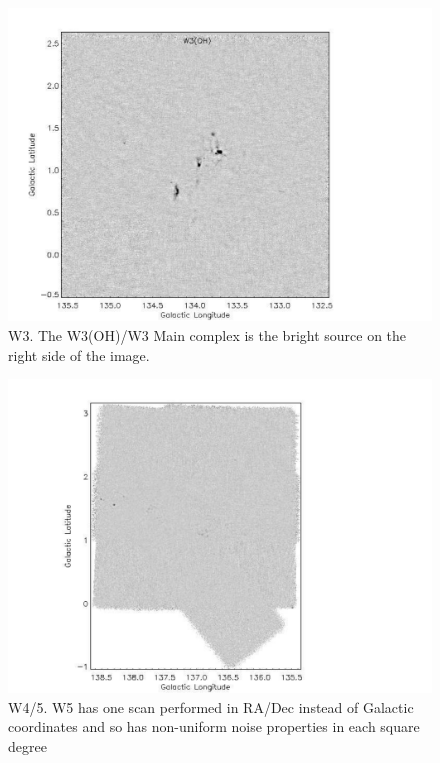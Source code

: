 \documentclass[12pt,preprint]{aastex}
\begin{document}
\addtocounter{figure}{-1}
\addtocounter{subfig}{1}

\begin{figure}
\begin{center}
  \includegraphics[scale=1.0]{f19g}
  \caption{W3.  The W3(OH)/W3 Main complex is the bright source
  on the right side of the image.}
\end{center}
\end{figure}

\addtocounter{figure}{-1}
\addtocounter{subfig}{1}

\begin{figure}
\begin{center}
  \includegraphics[scale=1.0]{f19h} \caption{W4/5.  W5 has one scan
  performed in RA/Dec instead of Galactic coordinates and so has
  non-uniform noise properties in each square degree}
\end{center}
\end{figure}
\end{document}
